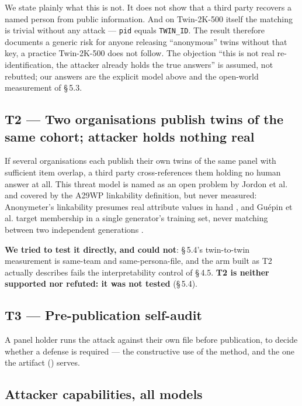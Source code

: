 \documentclass[sigconf,anonymous,review]{acmart}
\begin{document}
We state plainly what this is not. It does not show that a third party recovers a named person from public information. And on Twin-2K-500 itself the matching is trivial without any attack --- \texttt{pid} equals \texttt{TWIN\_\allowbreak{}ID}. The result therefore documents a generic risk for anyone releasing ``anonymous'' twins without that key, a practice Twin-2K-500 does not follow. The objection ``this is not real re-identification, the attacker already holds the true answers'' is assumed, not rebutted; our answers are the explicit model above and the open-world measurement of \S\,5.3.

\subsection{T2 --- Two organisations publish twins of the same cohort; attacker holds nothing real}

If several organisations each publish their own twins of the same panel with sufficient item overlap, a third party cross-references them holding no human answer at all. This threat model is named as an open problem by Jordon et al. \cite{jordon2022synthetic} and covered by the A29WP linkability definition, but never measured: Anonymeter's linkability presumes real attribute values in hand \cite{giomi2023unified}, and Guépin et al. target membership in a single generator's training set, never matching between two independent generations \cite{guepin2023synthetic}.

\textbf{We tried to test it directly, and could not}: \S\,5.4's twin-to-twin measurement is same-team and same-persona-file, and the arm built as T2 actually describes fails the interpretability control of \S\,4.5. \textbf{T2 is neither supported nor refuted: it was not tested} (\S\,5.4).

\subsection{T3 --- Pre-publication self-audit}

A panel holder runs the attack against their own file before publication, to decide whether a defense is required --- the constructive use of the method, and the one the artifact (\osname{}) serves.

\subsection{Attacker capabilities, all models}
\end{document}
